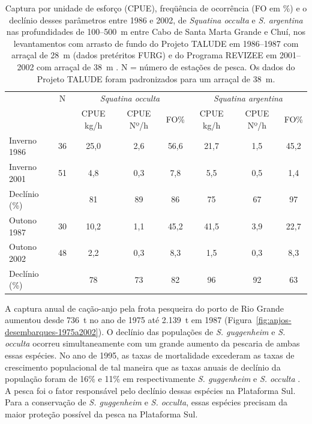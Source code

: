 \documentclass[a4paper,11pt,twoside,showtrims,onecolumn,openright,final]{memoir}
\begin{document}
\begin{table}
\caption[Captura por unidade de esforço (CPUE), freqüência de ocorrência (FO em \%) 
         e o declínio desses parâmetros entre 1986 e 2002, de \emph{Squatina occulta}
         e \emph{S. argentina}]
        {Captura por unidade de esforço (CPUE), freqüência de ocorrência (FO em \%) 
         e o declínio desses parâmetros entre 1986 e 2002, de \emph{Squatina occulta}
         e \emph{S. argentina} nas profundidades de 100--500~m entre Cabo de Santa Marta Grande e Chuí, 
         nos levantamentos com arrasto de fundo do Projeto TALUDE em 1986--1987 com arraçal 
         de 28~m (dados pretéritos FURG) e do Programa REVIZEE em 2001--2002 
         com arraçal de 38~m \citep{haimovici2002}.
         N = número de estações de pesca. 
         Os dados do Projeto TALUDE foram padronizados para um arraçal de 38~m.}
\label{tab:anjos-cpue-cientifica-variacao}
\begin{center}
\begin{footnotesize}
\begin{tabular*}{\textwidth}{l@{\extracolsep{\fill}}ccccccc}
\toprule
		& N 		& \multicolumn{3}{c}{\emph{Squatina occulta}}	& \multicolumn{3}{c}{\emph{Squatina argentina}}	\\
\cmidrule(r){3-5}  \cmidrule(l){6-8}
		& 		& CPUE kg/h	& CPUE Nº/h	& FO\%	& CPUE kg/h	& CPUE Nº/h	& FO\%	\\
\midrule
Inverno 1986	& 36		& 25,0		& 2,6		& 56,6	& 21,7		& 1,5		& 45,2	\\
Inverno 2001	& 51		& 4,8		& 0,3		& 7,8	& 5,5		& 0,5		& 1,4	\\
\addlinespace
Declínio (\%)	& 		& 81		& 89		& 86	& 75		& 67		& 97	\\
\midrule
Outono 1987	& 30		& 10,2		& 1,1		& 45,2	& 41,5		& 3,9		& 22,7	\\
Outono 2002	& 48		& 2,2		& 0,3		& 8,3	& 1,5		& 0,3		& 8,3	\\
\addlinespace
Declínio (\%)	& 		& 78		& 73		& 82	& 96		& 92		& 63	\\
\bottomrule
\end{tabular*}
\end{footnotesize}
\end{center}
\end{table}


A captura anual de cação-anjo pela frota pesqueira do porto de Rio Grande aumentou desde 736~t 
no ano de 1975 até 2.139~t em 1987 (Figura~\ref{fig:anjos-desembarques-1975a2002}). %
O declínio das populações de \emph{S. guggenheim} e \emph{S. occulta} ocorreu simultaneamente 
com um grande aumento da pescaria de ambas essas espécies. No ano de 1995, as taxas de mortalidade 
excederam as taxas de crescimento populacional de tal maneira que as taxas anuais de declínio 
da população foram de 16\% e 11\% em respectivamente \emph{S. guggenheim} e \emph{S. occulta} \citep{vieira1996}. %
A pesca foi o fator responsável pelo declínio dessas espécies na Plataforma Sul. 
Para a conservação de \emph{S. guggenheim} e \emph{S. occulta}, essas espécies precisam da maior 
proteção possível da pesca na Plataforma Sul.
\end{document}
